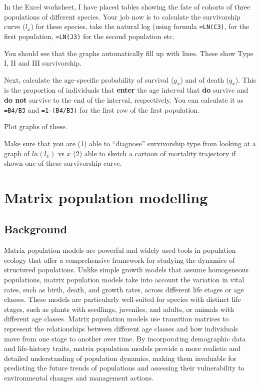 \documentclass[
  a4paper]{book}
\begin{document}
In the Excel worksheet, I have placed tables showing the fate of cohorts of three populations of different species. Your job now is to calculate the survivorship curve (\(l_x\)) for these species, take the natural log (using formula \texttt{=LN(C3)}, for the first population, \texttt{=LN(J3)} for the second population etc.

You should see that the graphs automatically fill up with lines. These show Type I, II and III survivorship.

Next, calculate the age-specific probability of survival (\(g_x\)) and of death (\(q_x\)). This is the proportion of individuals that \textbf{enter} the age interval that \textbf{do} survive and \textbf{do not} survive to the end of the interval, respectively. You can calculate it as \texttt{=B4/B3} and \texttt{=1-(B4/B3)} for the first row of the first population.

Plot graphs of these.

Make sure that you are (1) able to ``diagnose'' survivorship type from looking at a graph of \(ln(l_x)\) vs \(x\) (2) able to sketch a cartoon of mortality trajectory if shown one of these survivorship curve.

\hypertarget{matrix-population-modelling}{%
\chapter{Matrix population modelling}\label{matrix-population-modelling}}

\hypertarget{background-6}{%
\section{Background}\label{background-6}}

Matrix population models are powerful and widely used tools in population ecology that offer a comprehensive framework for studying the dynamics of structured populations. Unlike simple growth models that assume homogeneous populations, matrix population models take into account the variation in vital rates, such as birth, death, and growth rates, across different life stages or age classes. These models are particularly well-suited for species with distinct life stages, such as plants with seedlings, juveniles, and adults, or animals with different age classes. Matrix population models use transition matrices to represent the relationships between different age classes and how individuals move from one stage to another over time. By incorporating demographic data and life-history traits, matrix population models provide a more realistic and detailed understanding of population dynamics, making them invaluable for predicting the future trends of populations and assessing their vulnerability to environmental changes and management actions.
\end{document}
